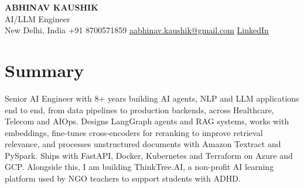 \documentclass[10pt,a4paper]{article}
\begin{document}
\begin{center}
  {\LARGE\bfseries ABHINAV KAUSHIK}\\[2pt]
  {\large AI/LLM Engineer}\\[2pt]
  New Delhi, India \textbar{} +91 8700571859 \textbar{} \href{mailto:aabhinav.kaushik@gmail.com}{aabhinav.kaushik@gmail.com} \textbar{} \href{https://www.linkedin.com/in/abhinav-kaushik10/}{LinkedIn}  
\end{center}

\section{Summary}
Senior AI Engineer with 8+ years building AI agents, NLP and LLM applications end to end, from data pipelines to production backends, across Healthcare, Telecom and AIOps. Designs LangGraph agents and RAG systems, works with embeddings, fine-tunes cross-encoders for reranking to improve retrieval relevance, and processes unstructured documents with Amazon Textract and PySpark. Ships with FastAPI, Docker, Kubernetes and Terraform on Azure and GCP. Alongside this, I am building ThinkTree.AI, a non-profit AI learning platform used by NGO teachers to support students with ADHD.
\end{document}
